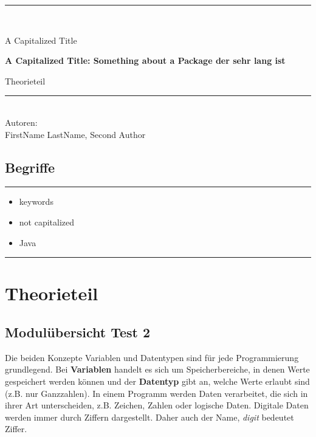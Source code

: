 \documentclass[10pt,paper=17cm:22cm, twoside=true, DIV=14]{scrbook}
\begin{document}
\begin{center} \noindent\rule{\textwidth}{0.4pt}\\ \vspace{0.5 cm} {\large \textsf{ A Capitalized Title }\par} \vspace{0.5 cm} {\LARGE \textbf{\textsf{ A Capitalized Title: Something about a Package der sehr lang ist  }}\par} \vspace{0.5 cm} {\Large \textsf{ Theorieteil }\par} \noindent\rule{\textwidth}{0.4pt}\\ \vspace{1 cm}Autoren: \\ \vspace{2 mm} FirstName LastName, Second Author \\ \end{center}

\section*{Begriffe}

\begin{minipage}{\textwidth} \hrule \begin{multicols}{2} \begin{itemize}[leftmargin=0mm] \item[] keywords \item[] not capitalized \item[] Java \end{itemize} \end{multicols} \vspace{-2mm} \hrule \end{minipage}

\clearpage \begingroup \let\clearpage\relax \let\cleardoublepage\relax \chapter{ Theorieteil } \endgroup 

\section{Modulübersicht Test 2}\label{modulubersicht-test-2}

Die beiden Konzepte Variablen und Datentypen sind für jede
Programmierung grundlegend. Bei \textbf{Variablen} handelt es sich um
Speicherbereiche, in denen Werte gespeichert werden können und der
\textbf{Datentyp} gibt an, welche Werte erlaubt sind (z.B. nur
Ganzzahlen). In einem Programm werden Daten verarbeitet, die sich in
ihrer Art unterscheiden, z.B. Zeichen, Zahlen oder logische Daten.
Digitale Daten werden immer durch Ziffern dargestellt. Daher auch der
Name, \emph{digit} bedeutet Ziffer.
\end{document}
